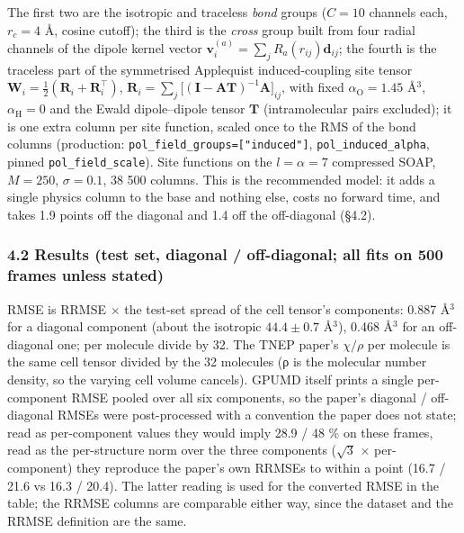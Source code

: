 \documentclass[
  10pt,
]{article}
\begin{document}
The first two are the isotropic and traceless \emph{bond} groups (\(C=10\) channels each,
\(r_c = 4\) \AA{}, cosine cutoff); the third is the \emph{cross} group built from four radial
channels of the dipole kernel vector \(\mathbf v^{(a)}_i=\sum_j R_a(r_{ij})\mathbf d_{ij}\); the
fourth is the traceless part of the symmetrised Applequist induced-coupling site tensor
\(\mathbf W_i=\tfrac12(\mathbf R_i+\mathbf R_i^\top)\),
\(\mathbf R_i=\sum_j\big[(\mathbf I-\mathbf A\mathbf T)^{-1}\mathbf A\big]_{ij}\), with fixed
\(\alpha_\mathrm O=1.45\) \AA{}\(^3\), \(\alpha_\mathrm H=0\) and the Ewald dipole--dipole tensor
\(\mathbf T\) (intramolecular pairs excluded); it is one extra column per site function, scaled once
to the RMS of the bond columns (production: \texttt{pol\_field\_groups={[}"induced"{]}},
\texttt{pol\_induced\_alpha}, pinned \texttt{pol\_field\_scale}). Site functions on the
\(l=\alpha=7\) compressed SOAP, \(M=250\), \(\sigma=0.1\), 38 500 columns. This is the recommended
model: it adds a single physics column to the base and nothing else, costs no forward time, and
takes 1.9 points off the diagonal and 1.4 off the off-diagonal (§4.2).

\subsubsection{4.2 Results (test set, diagonal / off-diagonal; all fits on 500 frames unless
stated)}\label{results-test-set-diagonal-off-diagonal-all-fits-on-500-frames-unless-stated}

RMSE is RRMSE \(\times\) the test-set spread of the cell tensor's components: 0.887 \AA{}\(^3\) for
a diagonal component (about the isotropic \(44.4\pm0.7\) \AA{}\(^3\)), 0.468 \AA{}\(^3\) for an
off-diagonal one; per molecule divide by 32. The TNEP paper's \(\chi/\rho\) per molecule is the same
cell tensor divided by the 32 molecules (ρ is the molecular number density, so the varying cell
volume cancels). GPUMD itself prints a single per-component RMSE pooled over all six components, so
the paper's diagonal / off-diagonal RMSEs were post-processed with a convention the paper does not
state; read as per-component values they would imply 28.9 / 48 \% on these frames, read as the
per-structure norm over the three components (\(\sqrt3\) \(\times\) per-component) they reproduce
the paper's own RRMSEs to within a point (16.7 / 21.6 vs 16.3 / 20.4). The latter reading is used
for the converted RMSE in the table; the RRMSE columns are comparable either way, since the dataset
and the RRMSE definition are the same.
\end{document}
